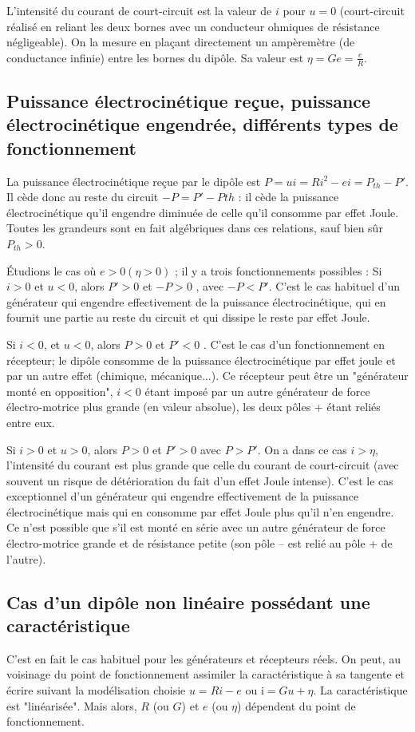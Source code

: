 L'intensité du courant de court-circuit est la valeur de $i$ pour $u = 0$
(court-circuit réalisé en reliant les deux bornes avec un conducteur ohmiques de
résistance négligeable). On la mesure en plaçant directement un ampèremètre (de
conductance infinie) entre les bornes du dipôle. Sa valeur est $\eta = Ge =
\frac{e}{R}$.
\subsection{Puissance électrocinétique reçue, puissance électrocinétique
engendrée, différents types de fonctionnement}

La puissance électrocinétique reçue par le dipôle est  $P  = u i = R i^2 - e i = P_{th} - P'$. Il cède donc au reste du circuit  $-P  = P' -P{th}$ : il cède la puissance électrocinétique qu'il engendre diminuée de celle qu'il consomme par effet Joule. Toutes les grandeurs sont en fait algébriques dans ces relations, sauf  bien sûr $P_{th} > 0$.
	
Étudions le cas où $e > 0 (\eta > 0)$ ; il y a trois fonctionnements possibles :
Si $i > 0$  et $u < 0$, alors $P'> 0$ et $-P  > 0$ , avec $-P  < P'$. C'est le cas habituel d'un générateur qui engendre effectivement de la puissance électrocinétique, qui en fournit une partie au reste du circuit et qui dissipe le reste par effet Joule.

Si $i < 0$, et $u < 0$, alors $P > 0$ et $P' < 0$ . C'est le cas d'un fonctionnement en récepteur; le dipôle consomme de la puissance électrocinétique par effet joule et par un autre effet (chimique, mécanique...). Ce récepteur peut être un "générateur monté en opposition", $i < 0$ étant imposé par un autre générateur de force électro-motrice plus grande (en valeur absolue), les deux pôles + étant reliés entre eux.

Si $i > 0$ et $u > 0$, alors $P > 0$ et $P' > 0$ avec  $P > P'$. On a dans ce cas $i > \eta$, l'intensité du courant est plus grande que celle du courant de court-circuit (avec souvent un risque de détérioration du fait d'un effet Joule intense). C'est le cas exceptionnel d'un générateur qui engendre effectivement de la puissance électrocinétique mais qui en consomme par effet Joule plus qu'il n'en engendre.  Ce n'est possible que s'il est monté en série avec un autre générateur de force électro-motrice grande et de résistance petite (son pôle – est relié au pôle + de l'autre).
\subsection{Cas d'un dipôle non linéaire possédant une caractéristique}
C'est en fait le cas habituel pour les générateurs et récepteurs réels. On peut, au voisinage du point de fonctionnement assimiler la caractéristique à sa tangente et écrire suivant la modélisation choisie $u = R i - e$ ou i$ = G u + \eta$. La caractéristique est "linéarisée". Mais alors, $R$ (ou $G$) et $e$ (ou $\eta$) dépendent du point de fonctionnement.
